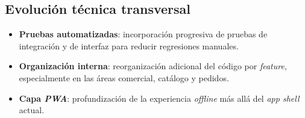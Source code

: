 \subsection*{Evolución técnica transversal}
\begin{itemize}
    \item \textbf{Pruebas automatizadas}: incorporación progresiva de pruebas de integración y de interfaz para reducir regresiones manuales.
    \item \textbf{Organización interna}: reorganización adicional del código por \textit{feature}, especialmente en las áreas comercial, catálogo y pedidos.
    \item \textbf{Capa \textit{PWA}}: profundización de la experiencia \textit{offline} más allá del \textit{app shell} actual.
\end{itemize}
